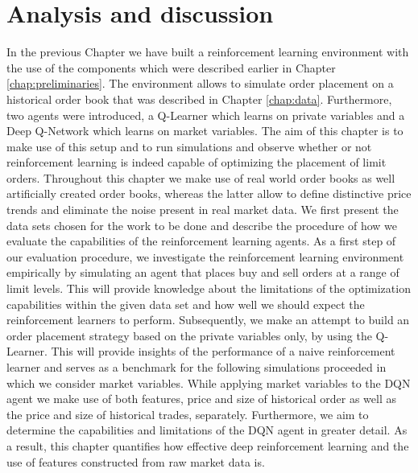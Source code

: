 \chapter{Analysis and discussion}
\label{chap:analysis}

In the previous Chapter we have built a reinforcement learning environment with the use of the components which were described earlier in Chapter \ref{chap:preliminaries}.
The environment allows to simulate order placement on a historical order book that was described in Chapter \ref{chap:data}.
Furthermore, two agents were introduced, a Q-Learner which learns on private variables and a Deep Q-Network which learns on market variables.
The aim of this chapter is to make use of this setup and to run simulations and observe whether or not reinforcement learning is indeed capable of optimizing the placement of limit orders.
Throughout this chapter we make use of real world order books as well artificially created order books, whereas the latter allow to define distinctive price trends and eliminate the noise present in real market data.
We first present the data sets chosen for the work to be done and describe the procedure of how we evaluate the capabilities of the reinforcement learning agents.
As a first step of our evaluation procedure, we investigate the reinforcement learning environment empirically by simulating an agent that places buy and sell orders at a range of limit levels.
This will provide knowledge about the limitations of the optimization capabilities within the given data set and how well we should expect the reinforcement learners to perform.
Subsequently, we make an attempt to build an order placement strategy based on the private variables only, by using the Q-Learner.
This will provide insights of the performance of a naive reinforcement learner and serves as a benchmark for the following simulations proceeded in which we consider market variables.
While applying market variables to the DQN agent we make use of both features, price and size of historical order as well as the price and size of historical trades, separately.
Furthermore, we aim to determine the capabilities and limitations of the DQN agent in greater detail.
As a result, this chapter quantifies how effective deep reinforcement learning and the use of features constructed from raw market data is.

